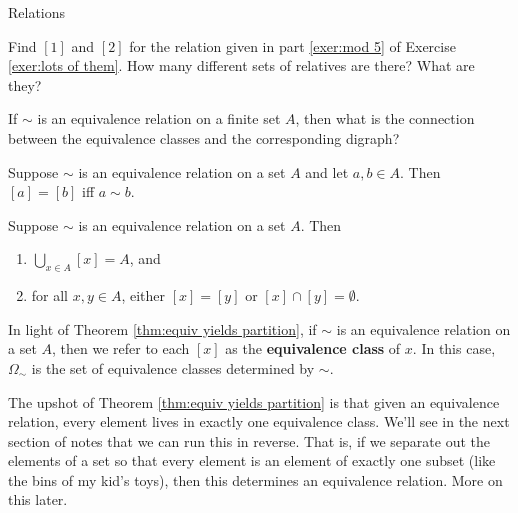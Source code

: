 \begin{section}{Relations}
\begin{exercise}
Find \([1]\) and \([2]\) for the relation given in part \ref{exer:mod 5} of Exercise \ref{exer:lots of them}.  How many different sets of relatives are there?  What are they?
\end{exercise}

\begin{exercise}
If \(\sim\) is an equivalence relation on a finite set \(A\), then what is the connection between the equivalence classes and the corresponding digraph?
\end{exercise}

\begin{theorem}
Suppose \(\sim\) is an equivalence relation on a set \(A\) and let \(a,b\in A\).  Then \([a]=[b]\) iff \(a\sim b\).
\end{theorem}

\begin{theorem}\label{thm:equiv yields partition}
Suppose \(\sim\) is an equivalence relation on a set \(A\).  Then
\begin{enumerate}
\item \(\bigcup_{x\in A}[x]=A\), and
\item for all \(x,y\in A\), either \([x]=[y]\) or \([x]\cap [y]=\emptyset\).
\end{enumerate}
\end{theorem}

\begin{definition}
In light of Theorem \ref{thm:equiv yields partition}, if \(\sim\) is an equivalence relation on a set \(A\), then we refer to each \([x]\) as the \textbf{equivalence class} of \(x\).  In this case, \(\Omega_{\sim}\) is the set of equivalence classes determined by \(\sim\).
\end{definition}

\begin{remark}
The upshot of Theorem \ref{thm:equiv yields partition} is that given an equivalence relation, every element lives in exactly one equivalence class.  We'll see in the next section of notes that we can run this in reverse.  That is, if we separate out the elements of a set so that every element is an element of exactly one subset (like the bins of my kid's toys), then this determines an equivalence relation.  More on this later.
\end{remark}

\end{section}

